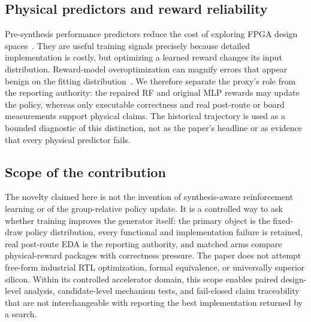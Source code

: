 \subsection{Physical predictors and reward reliability}

Pre-synthesis performance predictors reduce the cost of exploring FPGA design
spaces~\cite{ustun2020accurate,wu2022highlevel,fang2024presynthesis}.  They are
useful training signals precisely because detailed implementation is costly,
but optimizing a learned reward changes its input distribution.  Reward-model
overoptimization can magnify errors that appear benign on the fitting
distribution~\cite{gao2023scaling}.  We therefore separate the proxy's role
from the reporting authority: the repaired RF and original MLP rewards may
update the policy, whereas only executable correctness and real post-route or
board measurements support physical claims.  The historical trajectory is
used as a bounded diagnostic of this distinction, not as the paper's headline
or as evidence that every physical predictor fails.

\subsection{Scope of the contribution}

The novelty claimed here is not the invention of synthesis-aware reinforcement
learning or of the group-relative policy update.  It is a controlled way to ask
whether training improves the generator itself: the primary object is
the fixed-draw policy distribution, every functional and implementation failure
is retained, real post-route EDA is the reporting authority, and matched arms
compare physical-reward packages with correctness pressure.  The paper does not attempt free-form industrial RTL
optimization, formal equivalence, or universally superior silicon.  Within its
controlled accelerator domain, this scope enables paired design-level analysis,
candidate-level mechanism tests, and fail-closed claim traceability that are not
interchangeable with reporting the best implementation returned by a search.
